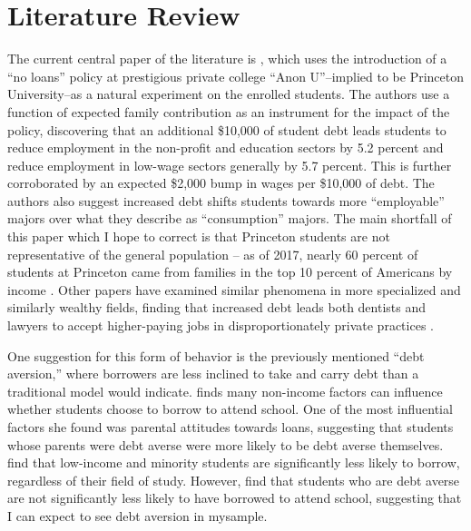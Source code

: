 \documentclass[12pt]{article}
\begin{document}
	\section{Literature Review}
	
	The current central paper of the literature is \textcite{rothstein2011}, which uses the introduction of a ``no loans'' policy at prestigious private college ``Anon U''--implied to be Princeton University--as a natural experiment on the enrolled students. The authors use a function of expected family contribution as an instrument for the impact of the policy, discovering that an additional \$10,000 of student debt leads students to reduce employment in the non-profit and education sectors by 5.2 percent and reduce employment in low-wage sectors generally by 5.7 percent. This is further corroborated by an expected \$2,000 bump in wages per \$10,000 of debt. The authors also suggest increased debt shifts students towards more ``employable'' majors over what they describe as ``consumption'' majors. The main shortfall of this paper which I hope to correct is that Princeton students are not representative of the general population -- as of 2017, nearly 60 percent of students at Princeton came from families in the top 10 percent of Americans by income \parencite{aisch2017}. Other papers have examined similar phenomena in more specialized and similarly wealthy fields, finding that increased debt leads both dentists and lawyers to accept higher-paying jobs in disproportionately private practices \parencite{nicholson2015, field2009}.
	
	One suggestion for this form of behavior is the previously mentioned ``debt aversion,'' where borrowers are less inclined to take and carry debt than a traditional model would indicate. \textcite{burdman2005} finds many non-income factors can influence whether students choose to borrow to attend school. One of the most influential factors she found was parental attitudes towards loans, suggesting that students whose parents were debt averse were more likely to be debt averse themselves. \textcite{callender2005} find that low-income and minority students are significantly less likely to borrow, regardless of their field of study. However, \textcite{eckel2007} find that students who are debt averse are not significantly less likely to have borrowed to attend school, suggesting that I can expect to see debt aversion in mysample. 
	
\end{document}

